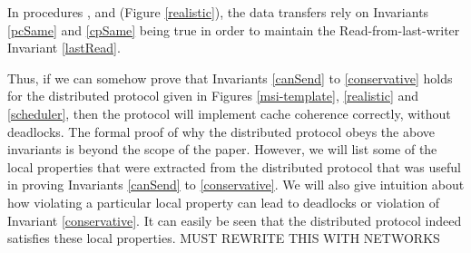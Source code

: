 In procedures \uResp{}, \dResp{} and \dRespL{} (Figure \ref{realistic}), the
data transfers rely on Invariants \ref{pcSame} and \ref{cpSame} being true in
order to maintain the Read-from-last-writer Invariant \ref{lastRead}.

Thus, if we can somehow prove that Invariants \ref{canSend} to
\ref{conservative} holds for the distributed protocol given in Figures
\ref{msi-template}, \ref{realistic} and \ref{scheduler}, then the protocol will
implement cache coherence correctly, without deadlocks. The formal proof of why
the distributed protocol obeys the above invariants is beyond the scope of the
paper. However, we will list some of the local properties that were extracted
from the distributed protocol that was useful in proving Invariants
\ref{canSend} to \ref{conservative}. We will also give intuition about how
violating a particular local property can lead to deadlocks or violation of
Invariant \ref{conservative}. It can easily be seen that the distributed
protocol indeed satisfies these local properties. MUST REWRITE THIS WITH NETWORKS
